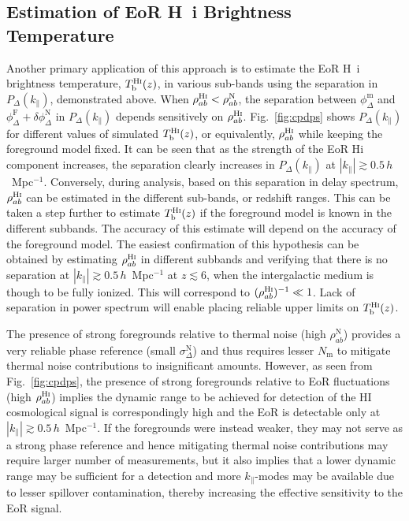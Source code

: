 \documentclass[
reprint,
superscriptaddress,
amsmath,
amssymb,
aps,
prd
]{revtex4-1}
\begin{document}
\subsection{Estimation of EoR H~{\sc i} Brightness Temperature}\label{sec:spin-temp}

Another primary application of this approach is to estimate the EoR H~{\sc i} brightness temperature, $T_\textrm{b}^\textrm{H{\sc i}}(z)$, in various sub-bands using the separation in $P_\Delta(k_\parallel)$, demonstrated above. When $\rho_{ab}^\textrm{H{\sc i}} < \rho_{ab}^\textrm{N}$, the separation between $\phi_\Delta^\textrm{m}$ and $\phi_\Delta^\textrm{F} + \delta\phi_\Delta^\textrm{N}$ in $P_\Delta(k_\parallel)$ depends sensitively on $\rho_{ab}^\textrm{H{\sc i}}$. Fig.~\ref{fig:cpdps} shows $P_\Delta(k_\parallel)$ for different values of simulated $T_\textrm{b}^\textrm{H{\sc i}}(z)$, or equivalently, $\rho_{ab}^\textrm{H{\sc i}}$ while keeping the foreground model fixed. It can be seen that as the strength of the EoR H{\sc i} component increases, the separation clearly increases in $P_\Delta(k_\parallel)$ at $|k_\parallel| \gtrsim 0.5\,h$~Mpc$^{-1}$. Conversely, during analysis, based on this separation in delay spectrum, $\rho_{ab}^\textrm{H{\sc i}}$ can be estimated in the different sub-bands, or redshift ranges. This can be taken a step further to estimate $T_\textrm{b}^\textrm{H{\sc i}}(z)$ if the foreground model is known in the different subbands. The accuracy of this estimate will depend on the accuracy of the foreground model. The easiest confirmation of this hypothesis can be obtained by estimating $\rho_{ab}^\textrm{H{\sc i}}$ in different subbands and verifying that there is no separation at $|k_\parallel| \gtrsim 0.5\,h$~Mpc$^{-1}$ at $z\lesssim 6$, when the intergalactic medium is though to be fully ionized. This will correspond to $(\rho_{ab}^\textrm{H{\sc i}})^{-1} \ll 1$. Lack of separation in power spectrum will enable placing reliable upper limits on $T_\textrm{b}^\textrm{H{\sc i}}(z)$.

The presence of strong foregrounds relative to thermal noise (high $\rho_{ab}^\textrm{N}$) provides a very reliable phase reference (small $\sigma_\Delta^\textrm{N}$) and thus requires lesser $N_\textrm{m}$ to mitigate thermal noise contributions to insignificant amounts. However, as seen from Fig.~\ref{fig:cpdps}, the presence of strong foregrounds relative to EoR fluctuations (high $\rho_{ab}^\textrm{H{\sc i}}$) implies the dynamic range to be achieved for detection of the HI cosmological signal is correspondingly high and the EoR is detectable only at $|k_\parallel| \gtrsim 0.5\,h$~Mpc$^{-1}$. If the foregrounds were instead weaker, they may not serve as a strong phase reference and hence mitigating thermal noise contributions may require larger number of measurements, but it also implies that a lower dynamic range may be sufficient for a detection and more $k_\parallel$-modes may be available due to lesser spillover contamination, thereby increasing the effective sensitivity to the EoR signal. 
\end{document}
